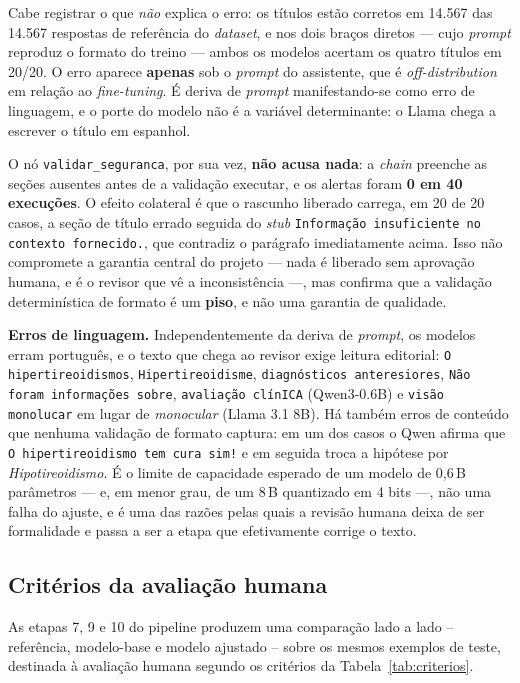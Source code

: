 \documentclass[12pt,a4paper]{article}
\begin{document}
Cabe registrar o que \emph{não} explica o erro: os títulos estão corretos em
14.567 das 14.567 respostas de referência do \emph{dataset}, e nos dois braços
diretos --- cujo \emph{prompt} reproduz o formato do treino --- ambos os modelos
acertam os quatro títulos em 20/20. O erro aparece \textbf{apenas} sob o
\emph{prompt} do assistente, que é \emph{off-distribution} em relação ao
\emph{fine-tuning}. É deriva de \emph{prompt} manifestando-se como erro de
linguagem, e o porte do modelo não é a variável determinante: o Llama chega a
escrever o título em espanhol.

O nó \texttt{validar\_seguranca}, por sua vez, \textbf{não acusa nada}: a
\emph{chain} preenche as seções ausentes antes de a validação executar, e os
alertas foram \textbf{0 em 40 execuções}. O efeito colateral é que o rascunho
liberado carrega, em 20 de 20 casos, a seção de título errado seguida do
\emph{stub} \texttt{Informação insuficiente no contexto fornecido.}, que
contradiz o parágrafo imediatamente acima. Isso não compromete a garantia
central do projeto --- nada é liberado sem aprovação humana, e é o revisor que vê
a inconsistência ---, mas confirma que a validação determinística de formato é
um \textbf{piso}, e não uma garantia de qualidade.

\medskip
\noindent\textbf{Erros de linguagem.} Independentemente da deriva de
\emph{prompt}, os modelos erram português, e o texto que chega ao revisor exige
leitura editorial: \texttt{O hipertireoidismos}, \texttt{Hipertireoidisme},
\texttt{diagnósticos anteresiores}, \texttt{Não foram informações sobre},
\texttt{avaliação clínICA} (Qwen3-0.6B) e \texttt{visão monolucar} em lugar de
\emph{monocular} (Llama 3.1 8B). Há também erros de conteúdo que nenhuma
validação de formato captura: em um dos casos o Qwen afirma que
\texttt{O hipertireoidismo tem cura sim!} e em seguida troca a hipótese por
\emph{Hipotireoidismo}. É o limite de capacidade esperado de um modelo de
0,6\,B parâmetros --- e, em menor grau, de um 8\,B quantizado em 4 bits ---, não
uma falha do ajuste, e é uma das razões pelas quais a revisão humana deixa de
ser formalidade e passa a ser a etapa que efetivamente corrige o texto.

\subsection{Critérios da avaliação humana}

As etapas 7, 9 e 10 do pipeline produzem uma comparação lado a lado -- referência,
modelo-base e modelo ajustado -- sobre os mesmos exemplos de teste, destinada à
avaliação humana segundo os critérios da Tabela~\ref{tab:criterios}.
\end{document}
